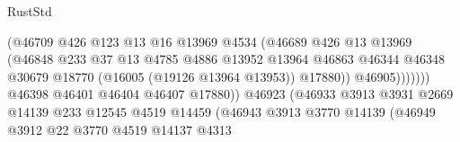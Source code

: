 \begin{lexlean}{RustStd}
\begin{coremodule}
                                              (@46709
                                                @426
                                                @123
                                                @13
                                                @16
                                                @13969
                                                @4534
                                                (@46689
                                                  @426
                                                  @13
                                                  @13969
                                                  (@46848
                                                    @233
                                                    @37
                                                    @13
                                                    @4785
                                                    @4886
                                                    @13952
                                                    @13964
                                                    @46863
                                                    @46344
                                                    @46348
                                                    @30679
                                                    @18770
                                                    (@16005 (@19126 @13964 @13953))
                                                    @17880))
                                                @46905)))))))
                                  @46398
                                  @46401
                                  @46404
                                  @46407
                                  @17880))
                              @46923
                              (@46933
                                @3913
                                @3931
                                @2669
                                @14139
                                @233
                                @12545
                                @4519
                                @14459
                                (@46943
                                  @3913
                                  @3770
                                  @14139
                                  (@46949
                                    @3912
                                    @22
                                    @3770
                                    @4519
                                    @14137
                                    @4313

\end{coremodule}
\end{lexlean}
